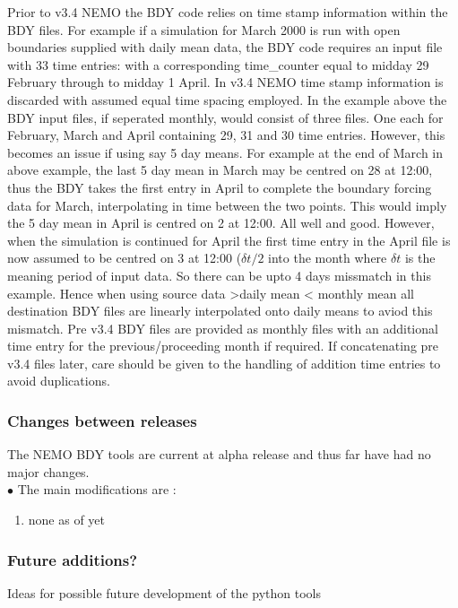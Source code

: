 Prior to v3.4 NEMO the BDY code relies on time stamp information within the BDY
files. For example if a simulation for March 2000 is run with open boundaries
supplied with daily mean data, the BDY code requires an input file with 33 time entries:
with a corresponding time\_counter equal to midday 29 February through to midday
1 April. In v3.4 NEMO time stamp information is discarded with assumed equal time spacing
employed. In the example above the BDY input files, if seperated monthly, would consist of
three files. One each for February, March and April containing 29, 31 and 30 time entries.
However, this becomes an issue if using say 5 day means. For example at the end of March in
above example, the last 5 day mean in March may be centred on 28 at 12:00, thus the BDY
takes the first entry in April to complete the boundary forcing data for March, interpolating
in time between the two points. This would imply the 5 day mean in April is centred on
2 at 12:00. All well and good. However, when the simulation is continued for April
the first time entry in the April file is now assumed to be centred on 3 at 12:00 ($\delta t/2$
into the month where $\delta t$ is the meaning period of input data. So there can be upto
4 days missmatch in this example. Hence when using source data >daily mean < monthly mean
all destination BDY files are linearly interpolated onto daily means to aviod this
mismatch. Pre v3.4 BDY files are provided as monthly files with an additional time entry
for the previous/proceeding month if required. If concatenating pre v3.4 files later, care
should be given to the handling of addition time entries to avoid duplications.

\subsubsection{Changes between releases}
The NEMO BDY tools are current at alpha release and thus far have had no major
changes.\\

$\bullet$ The main modifications are :\\
\begin{enumerate}
\item none as of yet
\end{enumerate}


\subsubsection{Future additions?}
Ideas for possible future development of the python tools

